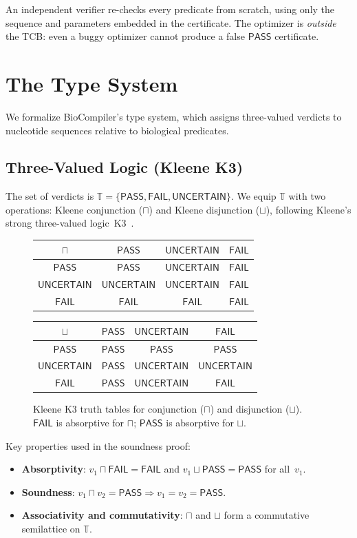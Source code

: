 \documentclass[runningheads]{llncs}
\newcommand{\PASS}{\ensuremath{\mathsf{PASS}}\xspace}
\newcommand{\FAIL}{\ensuremath{\mathsf{FAIL}}\xspace}
\newcommand{\UNCERTAIN}{\ensuremath{\mathsf{UNCERTAIN}}\xspace}
\newcommand{\tvl}{\mathbb{T}}
\begin{document}
An independent verifier re-checks every predicate from scratch, using
only the sequence and parameters embedded in the certificate.
The optimizer is \emph{outside} the TCB: even a buggy optimizer cannot
produce a false \PASS{} certificate.

\section{The Type System}\label{sec:typesys}

We formalize BioCompiler's type system, which assigns three-valued
verdicts to nucleotide sequences relative to biological predicates.

\subsection{Three-Valued Logic (Kleene K3)}\label{sec:3vl}

The set of verdicts is $\tvl = \{\PASS, \FAIL, \UNCERTAIN\}$.
We equip $\tvl$ with two operations: Kleene conjunction ($\sqcap$) and
Kleene disjunction ($\sqcup$), following Kleene's strong three-valued
logic~K3~\cite{kleene1952introduction}.

\begin{figure}[t]
\centering
\begin{tabular}{c|ccc}
$\sqcap$ & \PASS & \UNCERTAIN & \FAIL \\ \hline
\PASS     & \PASS     & \UNCERTAIN     & \FAIL \\
\UNCERTAIN & \UNCERTAIN & \UNCERTAIN     & \FAIL \\
\FAIL     & \FAIL     & \FAIL          & \FAIL
\end{tabular}
\hfill
\begin{tabular}{c|ccc}
$\sqcup$ & \PASS & \UNCERTAIN & \FAIL \\ \hline
\PASS     & \PASS     & \PASS          & \PASS \\
\UNCERTAIN & \PASS     & \UNCERTAIN     & \UNCERTAIN \\
\FAIL     & \PASS     & \UNCERTAIN     & \FAIL
\end{tabular}
\caption{Kleene K3 truth tables for conjunction ($\sqcap$) and
         disjunction ($\sqcup$). \FAIL{} is absorptive for $\sqcap$;
         \PASS{} is absorptive for $\sqcup$.}
\label{fig:truthtables}
\end{figure}

Key properties used in the soundness proof:
\begin{itemize}[leftmargin=*,itemsep=0pt,topsep=1pt]
\item \textbf{Absorptivity}: $v_1 \sqcap \FAIL = \FAIL$ and
      $v_1 \sqcup \PASS = \PASS$ for all~$v_1$.
\item \textbf{Soundness}: $v_1 \sqcap v_2 = \PASS \Rightarrow v_1 =
      v_2 = \PASS$.
\item \textbf{Associativity and commutativity}: $\sqcap$ and $\sqcup$
      form a commutative semilattice on $\tvl$.
\end{itemize}
\end{document}
